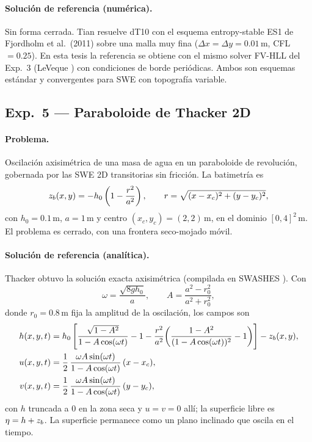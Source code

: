 \paragraph{Solución de referencia (numérica).}
Sin forma cerrada. Tian resuelve dT10 con el esquema entropy-stable ES1 de
Fjordholm et al.\ (2011) sobre una malla muy fina
($\Delta x = \Delta y = 0{.}01$\,m, CFL $= 0{.}25$). En esta tesis la
referencia se obtiene con el mismo solver FV-HLL del Exp.~3
(LeVeque \cite{leveque2002}) con condiciones de borde periódicas. Ambos
son esquemas estándar y convergentes para SWE con topografía variable.

\subsection{Exp.\ 5 --- Paraboloide de Thacker 2D}
\label{app:exp5}

\paragraph{Problema.}
Oscilación axisimétrica de una masa de agua en un paraboloide de revolución,
gobernada por las SWE 2D transitorias sin fricción. La batimetría es
\begin{equation}
  z_b(x,y) = -h_0\left(1 - \frac{r^2}{a^2}\right),
  \qquad r = \sqrt{(x - x_c)^2 + (y - y_c)^2},
\end{equation}
con $h_0 = 0.1$\,m, $a = 1$\,m y centro $(x_c, y_c) = (2, 2)$\,m, en el dominio
$[0, 4]^2$\,m. El problema es cerrado, con una frontera seco-mojado móvil.

\paragraph{Solución de referencia (analítica).}
Thacker \cite{thacker1981} obtuvo la solución exacta axisimétrica (compilada
en SWASHES \cite{delestre2013}). Con
\begin{equation}
  \omega = \frac{\sqrt{8 g h_0}}{a},
  \qquad
  A = \frac{a^2 - r_0^2}{a^2 + r_0^2},
\end{equation}
donde $r_0 = 0.8$\,m fija la amplitud de la oscilación, los campos son
\begin{align}
  h(x,y,t) &= h_0\left[
               \frac{\sqrt{1 - A^2}}{1 - A\cos(\omega t)} - 1
               - \frac{r^2}{a^2}\!
                 \left(\frac{1 - A^2}{(1 - A\cos(\omega t))^2} - 1\right)
              \right] - z_b(x,y),\\
  u(x,y,t) &= \frac{1}{2}\,
              \frac{\omega A \sin(\omega t)}{1 - A\cos(\omega t)}\,(x - x_c),\\
  v(x,y,t) &= \frac{1}{2}\,
              \frac{\omega A \sin(\omega t)}{1 - A\cos(\omega t)}\,(y - y_c),
\end{align}
con $h$ truncada a $0$ en la zona seca y $u = v = 0$ allí; la superficie libre
es $\eta = h + z_b$. La superficie permanece como un plano inclinado que
oscila en el tiempo.
